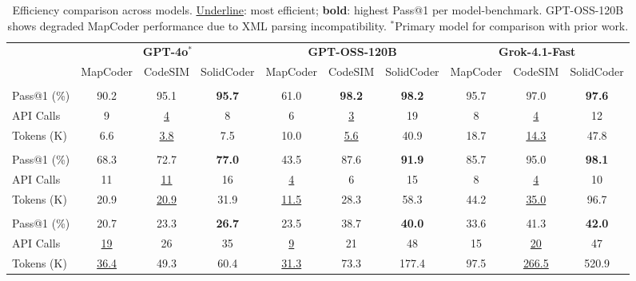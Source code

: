 \documentclass[11pt]{article}
\begin{document}
\begin{table}[t]
    \centering
    \small
    \setlength{\tabcolsep}{3pt}
    \begin{tabular}{@{}lccccccccc@{}}
        \toprule
        & \multicolumn{3}{c}{\textbf{GPT-4o}$^*$} & \multicolumn{3}{c}{\textbf{GPT-OSS-120B}} & \multicolumn{3}{c}{\textbf{Grok-4.1-Fast}} \\
        \cmidrule(lr){2-4} \cmidrule(lr){5-7} \cmidrule(lr){8-10}
        & MapCoder & CodeSIM & SolidCoder & MapCoder & CodeSIM & SolidCoder & MapCoder & CodeSIM & SolidCoder \\
        \midrule
        \rowcolor{green!10}
        \multicolumn{10}{c}{\textbf{HumanEval} \textcolor{green!60!black}{\scriptsize(EASY)}} \\
        Pass@1 (\%) & 90.2 & 95.1 & \textbf{95.7} & 61.0 & \textbf{98.2} & \textbf{98.2} & 95.7 & 97.0 & \textbf{97.6} \\
        API Calls & 9 & \underline{4} & 8 & 6 & \underline{3} & 19 & 8 & \underline{4} & 12 \\
        Tokens (K) & 6.6 & \underline{3.8} & 7.5 & 10.0 & \underline{5.6} & 40.9 & 18.7 & \underline{14.3} & 47.8 \\
        \addlinespace[3pt]
        \rowcolor{yellow!15}
        \multicolumn{10}{c}{\textbf{CodeContests} \textcolor{yellow!60!black}{\scriptsize(MEDIUM)}} \\
        Pass@1 (\%) & 68.3 & 72.7 & \textbf{77.0} & 43.5 & 87.6 & \textbf{91.9} & 85.7 & 95.0 & \textbf{98.1} \\
        API Calls & 11 & \underline{11} & 16 & \underline{4} & 6 & 15 & 8 & \underline{4} & 10 \\
        Tokens (K) & 20.9 & \underline{20.9} & 31.9 & \underline{11.5} & 28.3 & 58.3 & 44.2 & \underline{35.0} & 96.7 \\
        \addlinespace[3pt]
        \rowcolor{red!10}
        \multicolumn{10}{c}{\textbf{APPS} \textcolor{red!60!black}{\scriptsize(HARD)}} \\
        Pass@1 (\%) & 20.7 & 23.3 & \textbf{26.7} & 23.5 & 38.7 & \textbf{40.0} & 33.6 & 41.3 & \textbf{42.0} \\
        API Calls & \underline{19} & 26 & 35 & \underline{9} & 21 & 48 & 15 & \underline{20} & 47 \\
        Tokens (K) & \underline{36.4} & 49.3 & 60.4 & \underline{31.3} & 73.3 & 177.4 & 97.5 & \underline{266.5} & 520.9 \\
        \bottomrule
    \end{tabular}
    \caption{Efficiency comparison across models. \underline{Underline}: most efficient; \textbf{bold}: highest Pass@1 per model-benchmark. GPT-OSS-120B shows degraded MapCoder performance due to XML parsing incompatibility. $^*$Primary model for comparison with prior work.}
    \label{tab:efficiency}
\end{table}
\end{document}
